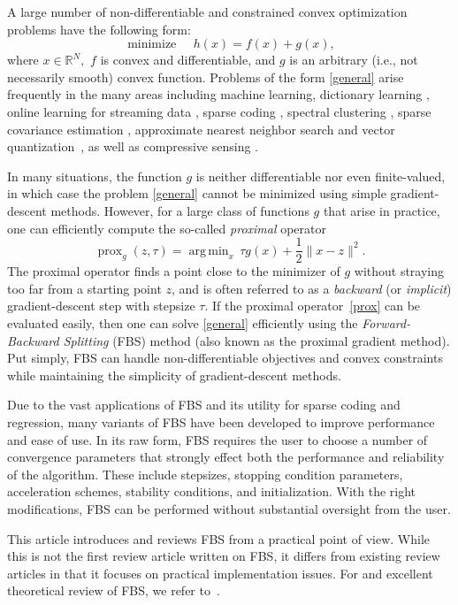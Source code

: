 \documentclass{amsart}
\newcommand{\half}{\frac{1}{2}}
\newcommand{\eqb}[1]{\begin{equation}\label{#1}}
\newcommand{\eqe}{\end{equation}}
\newcommand{\reals}{\mathbb{R}}
\DeclareMathOperator*{\minimize}{minimize\quad}
\DeclareMathOperator*{\argmin}{arg\,min}
\DeclareMathOperator{\prox}{prox}
\theoremstyle{definition}
\begin{document}
A large number of non-differentiable and constrained convex optimization problems have the following form:
\eqb{general}
\minimize h(x) = f(x)+g(x),
\eqe 
where $x\in\reals^N ,$  $f$ is convex and differentiable, and $g$ is an arbitrary (i.e., not necessarily smooth) convex function.  Problems of the form \eqref{general} arise frequently in the many areas including  machine learning, dictionary learning \cite{JMOB10}, online learning for streaming data \cite{DS09}, sparse coding \cite{KL10,SGL12}, spectral clustering \cite{HS11}, sparse covariance estimation \cite{OONR12}, approximate nearest neighbor search and vector quantization~\cite{JFF11}, as well as compressive sensing \cite{FNW07}.
  
In many situations, the function $g$ is neither differentiable nor even finite-valued, in which case the problem \eqref{general} cannot be minimized using simple gradient-descent methods. However, for a large class of functions $g$ that arise in practice, one can efficiently compute the so-called \emph{proximal} operator 
\eqb{prox}
\prox_g(z,\tau) = \argmin_x \,\tau g(x)+\half \|x-z\|^2.
\eqe
The proximal operator finds a point close to the minimizer of $g$ without straying too far from a starting point $z$, and is often referred to as a \emph{backward} (or \emph{implicit}) gradient-descent step with stepsize $\tau.$
If the proximal operator~\eqref{prox} can be evaluated easily, then one can  solve \eqref{general} efficiently using the \emph{Forward-Backward Splitting} (FBS) method (also known as the proximal gradient method). Put simply, FBS can handle non-differentiable objectives and convex constraints while maintaining the simplicity of gradient-descent methods.

 Due to the vast applications of FBS and its utility for sparse coding and regression, many variants of FBS have been developed to improve performance and ease of use.  In its raw form, FBS requires the user to choose a number of convergence parameters that strongly effect both the performance and reliability of the algorithm.  These include stepsizes, stopping condition parameters, acceleration schemes, stability conditions, and initialization.   With the right modifications, FBS can be performed without substantial oversight from the user.  
 
 This article introduces  and reviews FBS from a practical point of view.  While this is not the first review article written on FBS, it differs from existing review articles in that it focuses on practical implementation issues.  For and excellent theoretical review of FBS, we refer to~\cite{CP11}.
 
\end{document}

